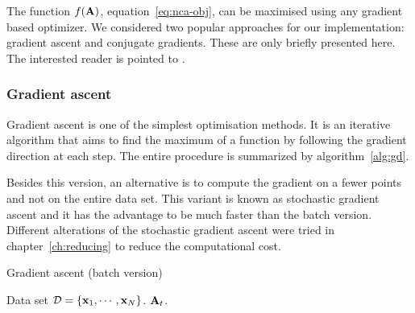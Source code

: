 	The function $f(\mathbf{A})$, equation~\eqref{eq:nca-obj}, can be maximised using any gradient based optimizer. We considered two popular approaches for our implementation: gradient ascent and conjugate gradients. These are only briefly presented here. The interested reader is pointed to \citep{bishop1995}.

	\subsubsection*{Gradient ascent}

	Gradient ascent is one of the simplest optimisation methods. It is an iterative algorithm that aims to find the maximum of a function by following the gradient direction at each step. The entire procedure is summarized by algorithm~\ref{alg:gd}. 

	Besides this version, an alternative is to compute the gradient on a fewer points and not on the entire data set. This variant is known as stochastic gradient ascent and it has the advantage to be much faster than the batch version. Different alterations of the stochastic gradient ascent were tried in chapter~\ref{ch:reducing} to reduce the computational cost.
      
	\begin{algorithm} 
		\caption{Gradient ascent (batch version)} 
		\label{alg:gd}  
		\begin{algorithmic}[1]                    %
			\REQUIRE Data set $\mathcal{D}=\{\mathbf{x}_1,\cdots,\mathbf{x}_N\}$.
			 \label{alg:gd-init}
			\REPEAT
			\RETURN $\mathbf{A}_{t}$.
		\end{algorithmic}
	\end{algorithm}

